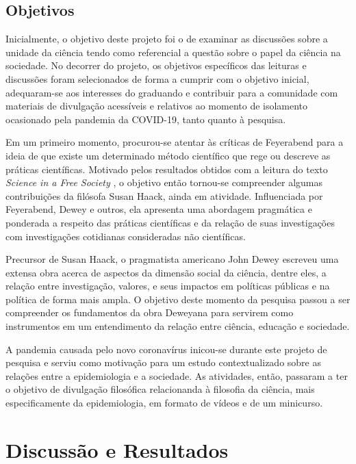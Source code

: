 \documentclass[12pt]{report}
\begin{document}
		\section*{Objetivos}
			Inicialmente, o objetivo deste projeto foi o de examinar as discussões sobre a unidade da ciência tendo como referencial a questão sobre o papel da ciência na sociedade.
			No decorrer do projeto, os objetivos específicos das leituras e discussões foram selecionados de forma a cumprir com o objetivo inicial, adequaram-se aos interesses do graduando e contribuir para a comunidade com materiais de divulgação acessíveis e relativos ao momento de isolamento ocasionado pela pandemia da COVID-19, tanto quanto à pesquisa.
			
			Em um primeiro momento, procurou-se atentar às críticas de Feyerabend para a ideia de que existe um determinado método científico que rege ou descreve as práticas científicas.
			Motivado pelos resultados obtidos com a leitura do texto \textit{Science in a Free Society} \cite{feyerabend-science-free-society}, o objetivo então tornou-se compreender algumas contribuições da filósofa Susan Haack, ainda em atividade.
			Influenciada por Feyerabend, Dewey e outros, ela apresenta uma abordagem pragmática e ponderada a respeito das práticas científicas e da relação de suas investigações com investigações cotidianas consideradas não científicas.
			
			Precursor de Susan Haack, o pragmatista americano John Dewey escreveu uma extensa obra acerca de aspectos da dimensão social da ciência, dentre eles, a relação entre investigação, valores, e seus impactos em políticas públicas e na política de forma mais ampla.
			O objetivo deste momento da pesquisa passou a ser compreender os fundamentos da obra Deweyana para servirem como instrumentos em um entendimento da relação entre ciência, educação e sociedade.
			
			A pandemia causada pelo novo coronavírus inicou-se durante este projeto de pesquisa e serviu como motivação para um estudo contextualizado sobre as relações entre a epidemiologia e a sociedade.
			As atividades, então, passaram a ter o objetivo de divulgação filosófica relacionanda à filosofia da ciência, mais especificamente da epidemiologia, em formato de vídeos e de um minicurso.
	
	\vspace*{-0.6cm}
	\chapter*{Discussão e Resultados}
	\vspace*{-0.75cm}
	
\end{document}
